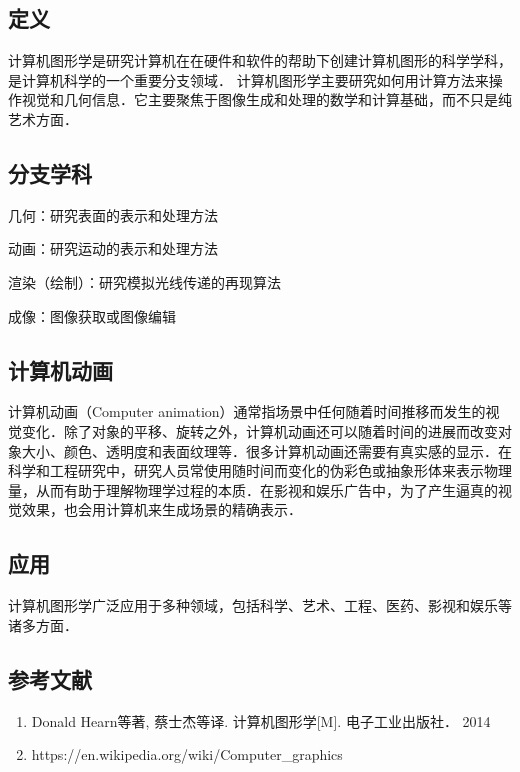 
\subsection{定义}
计算机图形学是研究计算机在在硬件和软件的帮助下创建计算机图形的科学学科，是计算机科学的一个重要分支领域．
计算机图形学主要研究如何用计算方法来操作视觉和几何信息．它主要聚焦于图像生成和处理的数学和计算基础，而不只是纯艺术方面．

\subsection{分支学科}
几何：研究表面的表示和处理方法

动画：研究运动的表示和处理方法

渲染（绘制）：研究模拟光线传递的再现算法

成像：图像获取或图像编辑


\subsection{计算机动画}
计算机动画（Computer animation）通常指场景中任何随着时间推移而发生的视觉变化．除了对象的平移、旋转之外，计算机动画还可以随着时间的进展而改变对象大小、颜色、透明度和表面纹理等．很多计算机动画还需要有真实感的显示．在科学和工程研究中，研究人员常使用随时间而变化的伪彩色或抽象形体来表示物理量，从而有助于理解物理学过程的本质．在影视和娱乐广告中，为了产生逼真的视觉效果，也会用计算机来生成场景的精确表示．


\subsection{应用}
计算机图形学广泛应用于多种领域，包括科学、艺术、工程、医药、影视和娱乐等诸多方面．


\subsection{参考文献}
\begin{enumerate}
\item Donald Hearn等著, 蔡士杰等译. 计算机图形学[M]. 电子工业出版社． 2014
\item https://en.wikipedia.org/wiki/Computer_graphics
\end{enumerate}